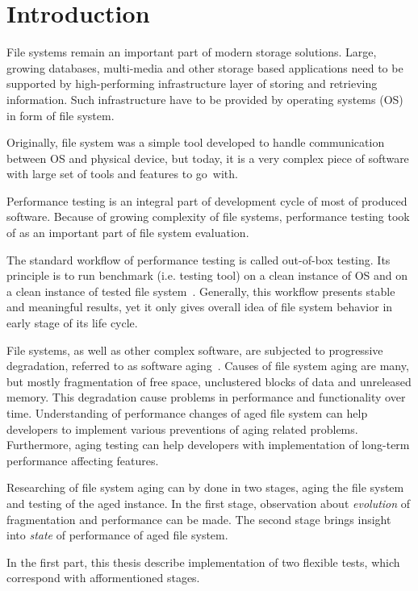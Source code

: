 \documentclass[
  color, %
  table, %
  lof,   %
  lot,   %
]{fithesis3}
\begin{document}
\chapter{Introduction}
File systems remain an important part of modern storage solutions. Large, growing databases, multi-media and other storage based applications need to be supported by high-performing infrastructure layer of storing and retrieving information. Such infrastructure have to be provided by operating systems (OS) in form of file system.

Originally, file system was a simple tool developed to handle communication between OS and physical device, but today, it is a very complex piece of software with large set of tools and features to go~with.

Performance testing is an integral part of development cycle of most of produced software. Because of growing complexity of file systems, performance testing took of as an important part of file system evaluation.

The standard workflow of performance testing is called out-of-box testing. Its principle is to run benchmark (i.e. testing tool) on a clean instance of OS and on a clean instance of tested file system~\cite{Traeger:2008:NYS:1367829.1367831}. Generally, this workflow presents stable and meaningful results, yet it only gives overall idea of file system behavior in early stage of its life cycle. 

File systems, as well as other complex software, are subjected to progressive degradation, referred to as software aging~\cite{Cotroneo:2014:SSA:2543749.2539117}. Causes of file system aging are many, but mostly fragmentation of free space, unclustered blocks of data and unreleased memory. This degradation cause problems in performance and functionality over time. Understanding of performance changes of aged file system can help developers to implement various preventions of aging related problems. Furthermore, aging testing can help developers with implementation of long-term performance affecting features.

Researching of file system aging can by done in two stages, aging the file system and testing of the aged instance. In the first stage, observation about \emph{evolution} of fragmentation and performance can be made. The second stage brings insight into \emph{state} of performance of aged file system.

In the first part, this thesis describe implementation of two flexible tests, which correspond with afformentioned stages.
 
\end{document}

